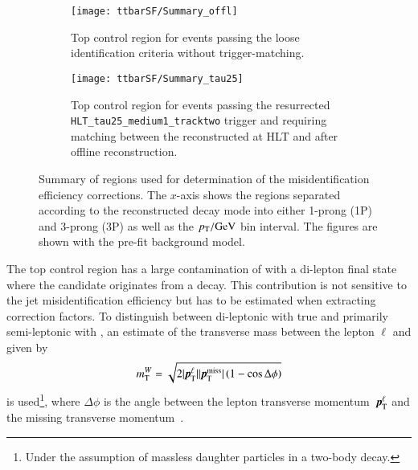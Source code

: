 \begin{figure}[htbp]
  \centering

  \begin{subfigure}[t]{.485\textwidth}
    \texttt{[image: ttbarSF/Summary\_offl]}
    \caption{Top control region for events passing the loose
      \tauhadvis identification criteria without trigger-matching.}
  \end{subfigure}\hfill%
  \begin{subfigure}[t]{.485\textwidth}
    \texttt{[image: ttbarSF/Summary\_tau25]}
    \caption{Top control region for events passing the resurrected
      \texttt{HLT\_tau25\_medium1\_tracktwo} trigger and requiring
      matching between the reconstructed \tauhadvis at HLT and after
      offline \tauhadvis reconstruction.}
  \end{subfigure}

  \caption{Summary of regions used for determination of the \tauhadvis
    misidentification efficiency corrections. The $x$-axis shows the
    regions separated according to the reconstructed decay mode into
    either 1-prong (1P) and 3-prong (3P) \tauhadvis as well as the
    \tauhadvis $\pT /\si{\GeV}$ bin interval. The figures are shown
    with the pre-fit background model.}
  \label{fig:ttbarsf_region_summary_prefit}
\end{figure}

The top control region has a large contamination of \ttbar with a
di-lepton final state where the \tauhadvis candidate originates from a
\tauhad decay. This contribution is not sensitive to the jet \ra
\tauhadvis misidentification efficiency but has to be estimated when
extracting correction factors. To distinguish between di-leptonic
\ttbar with true \tauhadvis and primarily semi-leptonic \ttbar with
\faketauhadvis, an estimate of the transverse mass between the lepton
$\ell$ and \pTmissAbs given by
\begin{align*}
  \mTW = \sqrt{2 | \myvec{p}_{\text{T}}^{\ell} | | \pTmiss | \left( 1 - \cos \Delta\phi \right)}
\end{align*}
is used\footnote{Under the assumption of massless daughter particles
  in a two-body decay.}, where $\Delta \phi$ is the angle between the
lepton transverse momentum~$\myvec{p}_{\text{T}}^{\ell}$ and the
missing transverse momentum~\pTmiss.

